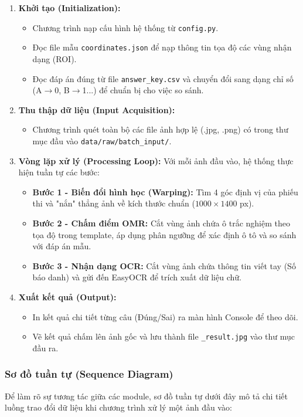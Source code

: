 \documentclass[6pt, a4paper]{report}
\begin{document}
	\begin{enumerate}
		\item \textbf{Khởi tạo (Initialization):}
		\begin{itemize}
			\item Chương trình nạp cấu hình hệ thống từ \texttt{config.py}.
			\item Đọc file mẫu \texttt{coordinates.json} để nạp thông tin tọa độ các vùng nhận dạng (ROI).
			\item Đọc đáp án đúng từ file \texttt{answer\_key.csv} và chuyển đổi sang dạng chỉ số (A$\rightarrow$0, B$\rightarrow$1...) để chuẩn bị cho việc so sánh.
		\end{itemize}
		
		\item \textbf{Thu thập dữ liệu (Input Acquisition):}
		\begin{itemize}
			\item Chương trình quét toàn bộ các file ảnh hợp lệ (.jpg, .png) có trong thư mục đầu vào \texttt{data/raw/batch\_input/}.
		\end{itemize}
		
		\item \textbf{Vòng lặp xử lý (Processing Loop):}
		Với mỗi ảnh đầu vào, hệ thống thực hiện tuần tự các bước:
		\begin{itemize}
			\item \textbf{Bước 1 - Biến đổi hình học (Warping):} Tìm 4 góc định vị của phiếu thi và "nắn" thẳng ảnh về kích thước chuẩn ($1000 \times 1400$ px).
			\item \textbf{Bước 2 - Chấm điểm OMR:} Cắt vùng ảnh chứa ô trắc nghiệm theo tọa độ trong template, áp dụng phân ngưỡng để xác định ô tô và so sánh với đáp án mẫu.
			\item \textbf{Bước 3 - Nhận dạng OCR:} Cắt vùng ảnh chứa thông tin viết tay (Số báo danh) và gửi đến EasyOCR để trích xuất dữ liệu chữ.
		\end{itemize}
		
		\item \textbf{Xuất kết quả (Output):}
		\begin{itemize}
			\item In kết quả chi tiết từng câu (Đúng/Sai) ra màn hình Console để theo dõi.
			\item Vẽ kết quả chấm lên ảnh gốc và lưu thành file \texttt{\_result.jpg} vào thư mục đầu ra.
		\end{itemize}
	\end{enumerate}
	
	\subsubsection{Sơ đồ tuần tự (Sequence Diagram)}
	Để làm rõ sự tương tác giữa các module, sơ đồ tuần tự dưới đây mô tả chi tiết luồng trao đổi dữ liệu khi chương trình xử lý một ảnh đầu vào:
	
\end{document}
